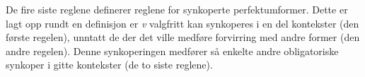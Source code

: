 \documentclass{article}
\let\w\emph
\begin{document}
De fire siste reglene definerer reglene for synkoperte perfektumformer. Dette
er lagt opp rundt en definisjon er \w{v} valgfritt kan synkoperes i en del
kontekster (den f\o{}rste regelen), unntatt de der det ville medf\o{}re
forvirring med andre former (den andre regelen). Denne synkoperingen
medf\o{}rer s\aa{} enkelte andre obligatoriske synkoper i gitte kontekster (de
to siste reglene).
\end{document}
